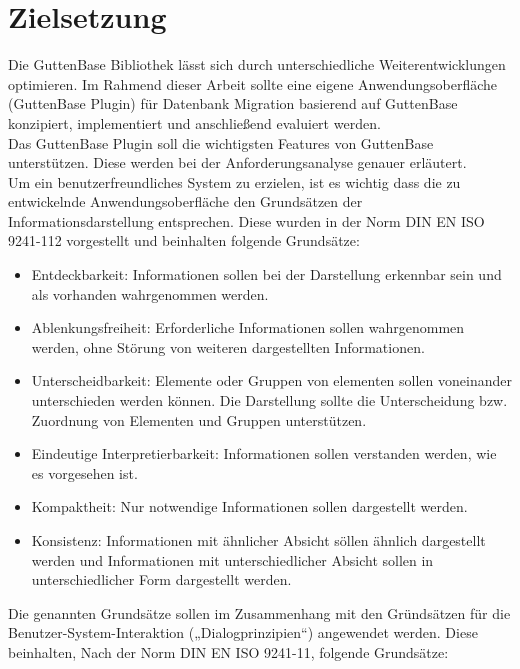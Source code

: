 \section{Zielsetzung}
Die GuttenBase Bibliothek lässt sich durch unterschiedliche Weiterentwicklungen optimieren. 
Im Rahmend dieser Arbeit sollte  eine eigene Anwendungsoberfläche (GuttenBase Plugin) für Datenbank Migration basierend auf GuttenBase konzipiert, implementiert und anschließend evaluiert werden. \\
Das GuttenBase Plugin soll die wichtigsten Features von GuttenBase unterstützen. Diese werden bei der Anforderungsanalyse genauer erläutert.\\
Um ein benutzerfreundliches System zu erzielen, ist es wichtig dass die zu entwickelnde Anwendungsoberfläche den Grundsätzen der Informationsdarstellung entsprechen. Diese wurden in der Norm DIN EN ISO 9241-112 vorgestellt und beinhalten folgende Grundsätze:
\begin{itemize}
	\item Entdeckbarkeit: 
	Informationen sollen bei der Darstellung erkennbar sein und als vorhanden wahrgenommen werden.
	
	\item Ablenkungsfreiheit: 
	Erforderliche Informationen sollen wahrgenommen werden, ohne Störung von weiteren dargestellten Informationen.
	
	\item Unterscheidbarkeit: 
	Elemente oder Gruppen von elementen sollen voneinander unterschieden werden können. Die Darstellung sollte die Unterscheidung bzw. Zuordnung von Elementen und Gruppen unterstützen.
	
	\item Eindeutige Interpretierbarkeit:
	Informationen sollen verstanden werden, wie es vorgesehen ist.
	
	\item Kompaktheit:
	Nur notwendige Informationen sollen dargestellt werden.
	
	\item Konsistenz:
	Informationen mit ähnlicher Absicht söllen ähnlich dargestellt werden und Informationen mit unterschiedlicher Absicht sollen in unterschiedlicher Form dargestellt werden.
	
\end{itemize}
Die genannten Grundsätze sollen im Zusammenhang mit den Gründsätzen für die Benutzer-System-Interaktion („Dialogprinzipien“) angewendet werden. Diese beinhalten, Nach der Norm DIN EN ISO 9241-11, folgende Grundsätze:
